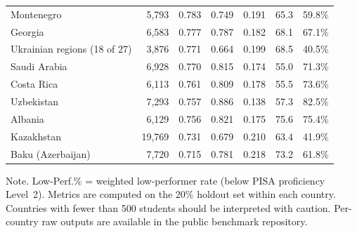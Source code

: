 \begin{table}[htp]
\begin{tabular}{@{}lrrrrrr@{}}
Montenegro & 5,793 & 0.783 & 0.749 & 0.191 & 65.3 & 59.8\% \\
Georgia & 6,583 & 0.777 & 0.787 & 0.182 & 68.1 & 67.1\% \\
Ukrainian regions (18 of 27) & 3,876 & 0.771 & 0.664 & 0.199 & 68.5 & 40.5\% \\
Saudi Arabia & 6,928 & 0.770 & 0.815 & 0.174 & 55.0 & 71.3\% \\
Costa Rica & 6,113 & 0.761 & 0.809 & 0.178 & 55.5 & 73.6\% \\
Uzbekistan & 7,293 & 0.757 & 0.886 & 0.138 & 57.3 & 82.5\% \\
Albania & 6,129 & 0.756 & 0.821 & 0.175 & 75.6 & 75.4\% \\
Kazakhstan & 19,769 & 0.731 & 0.679 & 0.210 & 63.4 & 41.9\% \\
Baku (Azerbaijan) & 7,720 & 0.715 & 0.781 & 0.218 & 73.2 & 61.8\% \\
\bottomrule
\end{tabular}
\begin{tablenotes}
\item Note. Low-Perf.\% = weighted low-performer rate (below PISA proficiency Level~2). Metrics are computed on the 20\% holdout set within each country. Countries with fewer than 500 students should be interpreted with caution. Per-country raw outputs are available in the public benchmark repository.
\end{tablenotes}
\end{table}
